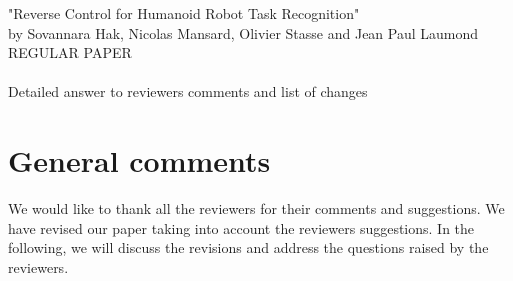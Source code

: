 \documentclass[11pt]{article}
\begin{document}
\begin{center}
  {\large "Reverse Control for Humanoid Robot Task Recognition" \\
  \small by Sovannara Hak, Nicolas Mansard, Olivier Stasse and Jean Paul Laumond\\
  \small REGULAR PAPER \\
  ~ \\
  \large Detailed answer to reviewers comments and list of changes\\}
\end{center}


\section{General comments}
We would like to thank all the reviewers for their comments and suggestions.
We have revised	our paper taking into account the reviewers suggestions.
In the following, we will discuss the revisions and address the questions raised by the reviewers.

\end{document}
